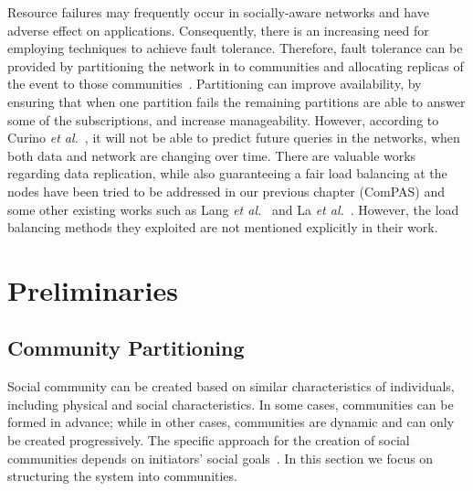 Resource failures may frequently occur in socially-aware networks and have adverse effect on applications. Consequently, there is an increasing need for employing techniques to achieve fault tolerance. Therefore, fault tolerance can be provided by partitioning the network in to communities and allocating replicas of the event to those communities~\cite{Pujol2010}\cite{SGitzenis2013}\cite{MYuan2012}. Partitioning can improve availability, by ensuring that when one partition fails the remaining partitions are able to answer some of the subscriptions, and increase manageability. However, according to Curino {\it et al.}~\cite{CCurino2010}, it will not be able to predict future queries in the networks, when both data and network are changing over time. There are valuable works regarding data replication, while also guaranteeing a fair load balancing at the nodes have been tried to be addressed in our previous chapter (ComPAS) and some other existing works such as Lang {\it et al.}~\cite{WLang2010} and La {\it et al.}~\cite{CALa2012}. However, the load balancing methods they exploited are not mentioned explicitly in their work.


\section{Preliminaries}\label{Chap5_03}

\subsection{Community Partitioning}\label{Chap5_03_01}

Social community can be created based on similar characteristics of individuals, including physical and social characteristics. In some cases, communities can be formed in advance; while in other cases, communities are dynamic and can only be created progressively. The specific approach for the creation of social communities depends on initiators' social goals~\cite{DZhang2011}. In this section we focus on structuring the system into communities.

